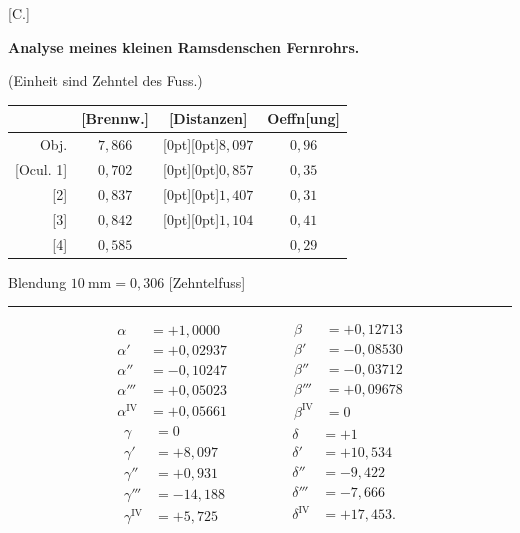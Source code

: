 \clearpage\begingroup
{}
\begin{center}[C.]\end{center}
\noindent{\small [S. 309]}
\begin{center}
\textbf{Analyse meines kleinen Ramsdenschen Fernrohrs.}\par\medskip
(Einheit sind Zehntel des Fuss.)
\end{center}
\begin{center}
\renewcommand{\arraystretch}{1.4}\setlength{\tabcolsep}{9pt}
\begin{tabular}{r|c|c|c}
\hline\hline
&[Brennw.]&[Distanzen]&Oeffn[ung]\\
\hline\hline
Obj.&$7{,}866$&\raisebox{-.5\normalbaselineskip}[0pt][0pt]{$8{,}097$}&$0{,}96$\\
{}[Ocul. 1]&$0{,}702$&\raisebox{-.5\normalbaselineskip}[0pt][0pt]{$0{,}857$}&$0{,}35$\\
{}[2]&$0{,}837$&\raisebox{-.5\normalbaselineskip}[0pt][0pt]{$1{,}407$}&$0{,}31$\\
{}[3]&$0{,}842$&\raisebox{-.5\normalbaselineskip}[0pt][0pt]{$1{,}104$}&$0{,}41$\\
{}[4]&$0{,}585$&&$0{,}29$
\end{tabular}\par\medskip
Blendung $10\ \mathrm{mm}=0{,}306$ [Zehntelfuss]
\end{center}
\noindent\rule{\linewidth}{.4pt}
\[
\begin{aligned}
\alpha&=+1{,}0000\\
\alpha'&=+0{,}02937\\
\alpha''&=-0{,}10247\\
\alpha'''&=+0{,}05023\\
\alpha^{\mathrm{IV}}&=+0{,}05661
\end{aligned}\qquad\qquad
\begin{aligned}
\beta&=+0{,}12713\\
\beta'&=-0{,}08530\\
\beta''&=-0{,}03712\\
\beta'''&=+0{,}09678\\
\beta^{\mathrm{IV}}&=0
\end{aligned}
\]
\[
\begin{aligned}
\gamma&=0\\
\gamma'&=+8{,}097\\
\gamma''&=+0{,}931\\
\gamma'''&=-14{,}188\\
\gamma^{\mathrm{IV}}&=+5{,}725
\end{aligned}\qquad\qquad
\begin{aligned}
\delta&=+1\\
\delta'&=+10{,}534\\
\delta''&=-9{,}422\\
\delta'''&=-7{,}666\\
\delta^{\mathrm{IV}}&=+17{,}453.
\end{aligned}
\]
